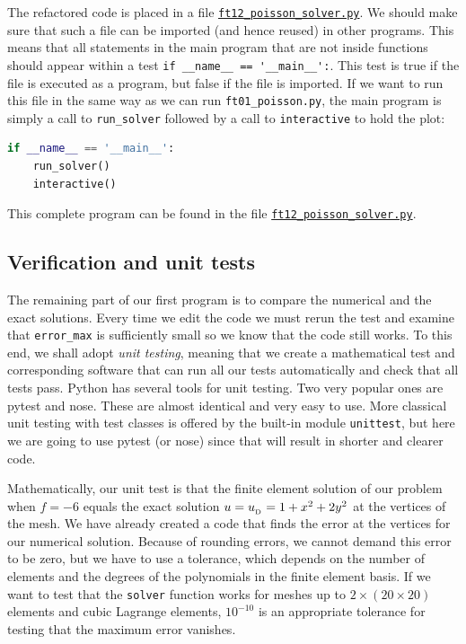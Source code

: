 \documentclass[graybox,envcountchap,sectrefs,final]{svmonodo}
\begin{document}

The refactored code is placed in a file
\href{{https://fenicsproject.org/pub/tutorial/python/vol1/ft12_poisson_solver.py}}{\nolinkurl{ft12_poisson_solver.py}}.
We should make sure that such a file can be imported (and hence
reused) in other programs. This means that all statements in the main
program that are not inside functions should appear within a test
\Verb!if __name__ == '__main__':!. This test is true if the file is executed as
a program, but false if the file is imported.  If we want to run this
file in the same way as we can run \Verb!ft01_poisson.py!, the
main program is simply a call to \Verb!run_solver! followed by a call to
\texttt{interactive} to hold the plot:

\begin{lstlisting}[language=Python,style=graycolor]
if __name__ == '__main__':
    run_solver()
    interactive()
\end{lstlisting}
This complete program can be found in the file \href{{https://fenicsproject.org/pub/tutorial/python/vol1/ft12_poisson_solver.py}}{\nolinkurl{ft12_poisson_solver.py}}.


\subsection{Verification and unit tests}


The remaining part of our first program is to compare the numerical
and the exact solutions. Every time we edit the code we must rerun the
test and examine that \Verb!error_max! is sufficiently small so we know
that the code still works. To this end, we shall adopt \emph{unit testing},
meaning that we create a mathematical test and corresponding software
that can run all our tests automatically and check that all tests
pass.  Python has several tools for unit testing. Two very popular
ones are pytest and nose. These are almost identical and very easy
to use.  More classical unit testing with test classes is offered by
the built-in module \texttt{unittest}, but here we are going to use pytest
(or nose) since that will result in shorter and clearer code.

Mathematically, our unit test is that the finite element solution of
our problem when $f=-6$ equals the exact solution $u=\ub=1+x^2+2y^2$
at the vertices of the mesh.
We have already created a code that finds the error at the vertices for
our numerical solution. Because of rounding errors, we cannot demand this
error to be zero, but we have to use a tolerance, which
depends on the number of elements and the degrees of the polynomials
in the finite element basis. If we want to test that the
\texttt{solver} function works for meshes up to $2\times(20\times 20)$
elements and cubic Lagrange elements, $10^{-10}$ is an appropriate
tolerance for testing that the maximum error vanishes.
\end{document}

